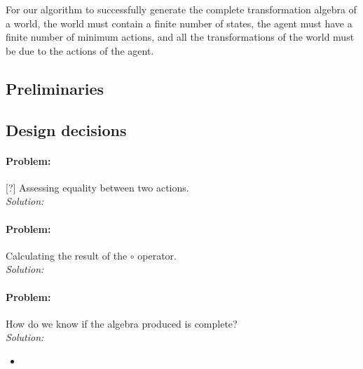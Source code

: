 For our algorithm to successfully generate the complete transformation algebra of a world, the world must contain a finite number of states, the agent must have a finite number of minimum actions, and all the transformations of the world must be due to the actions of the agent.

\subsection{Preliminaries}


\subsection{Design decisions}

\paragraph{Problem:}
[?] Assessing equality between two actions.
\\\textit{Solution:}


\paragraph{Problem:}
Calculating the result of the $\circ$ operator.
\\\textit{Solution:}




\paragraph{Problem:}
How do we know if the algebra produced is complete?
\\\textit{Solution:}
\begin{itemize}
	\item
\end{itemize}


